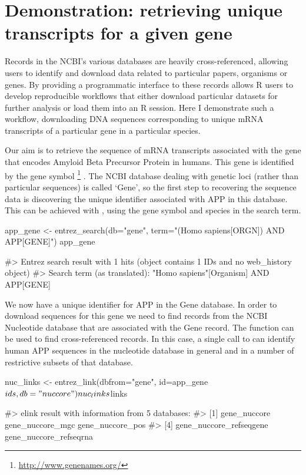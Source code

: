 \section{Demonstration: retrieving unique transcripts for a given gene}

Records in the NCBI's various databases are heavily cross-referenced, allowing
users to identify and download data related to particular papers, organisms or 
genes. By providing a programmatic interface to these records 
allows R users to develop reproducible workflows that either download particular
datasets for further analysis or load them into an R session. Here I demonstrate
such a workflow, downloading DNA sequences corresponding to unique
mRNA transcripts of a particular gene in a particular species.

Our aim is to retrieve the sequence of mRNA transcripts associated with the gene 
that encodes Amyloid Beta Precursor Protein in humans. This gene is identified 
by the gene symbol \footnote{\url{http://www.genenames.org/}} . The 
NCBI database dealing with genetic loci (rather than particular sequences) is 
called `Gene', so the first step to recovering the sequence data is discovering 
the unique identifier associated with APP in this database. This can be 
achieved with , using the gene symbol and species in the 
search term.

\begin{example}
app_gene <- entrez_search(db="gene", term="(Homo sapiens[ORGN]) AND APP[GENE]")
app_gene

#> Entrez search result with 1 hits (object contains 1 IDs and no web_history object)
#>  Search term (as translated):  "Homo sapiens"[Organism] AND APP[GENE]
\end{example}

We now have a unique identifier for APP in the Gene database. In order to download 
sequences for this gene we need to find records from the NCBI Nucleotide database 
that are associated with the Gene record. The function  can be 
used to find cross-referenced records. In this case, a single call to 
 can identify human APP sequences in the nucleotide database in 
general and in a number of restrictive subsets of that database.

\begin{example}
nuc_links <- entrez_link(dbfrom="gene", id=app_gene$ids, db="nuccore")
nuc_links$links

#> elink result with information from 5 databases:
#> [1] gene_nuccore            gene_nuccore_mgc        gene_nuccore_pos       
#> [4] gene_nuccore_refseqgene gene_nuccore_refseqrna
\end{example}


